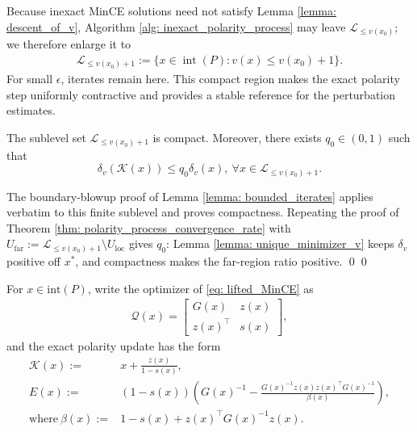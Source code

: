 \documentclass[smallextended]{svjour3}
\let\springerproof\proof
\let\endspringerproof\endproof
\renewenvironment{proof}{\springerproof}{%
  \ifhmode\qed\else\leavevmode\qed\fi\endspringerproof}
\newcommand{\K}{\mathcal{K}}
\begin{document}
Because inexact MinCE solutions need not satisfy Lemma
\ref{lemma: descent_of_v}, Algorithm \ref{alg: inexact_polarity_process} may
leave $\mathcal{L}_{\leq v(x_0)}$; we therefore enlarge it to
\begin{align}\label{eq: enlarged_sublevel_set}
    \mathcal{L}_{\leq v(x_0)+1} := \{ x \in \operatorname{int}(P): v(x) \leq v(x_0) + 1\}.
\end{align}
For small $\epsilon$, iterates remain here. This compact region makes the exact
polarity step uniformly contractive and provides a stable reference for the
perturbation estimates.
\begin{lemma}\label{lemma: inexact_sublevel_set}
    The sublevel set $\mathcal{L}_{\leq v(x_0)+1}$ is compact. Moreover, there exists $q_0\in (0,1)$ such that
        \begin{equation}\label{eq: inexact_q0}
            \delta_v(\K(x))\le q_0\delta_v(x), ~ \forall x\in \mathcal{L}_{\leq v(x_0)+1}.
        \end{equation}
\end{lemma}
\begin{proof}
    The boundary-blowup proof of Lemma \ref{lemma: bounded_iterates} applies
    verbatim to this finite sublevel and proves compactness. Repeating the
    proof of Theorem \ref{thm: polarity_process_convergence_rate} with
    $U_\mathrm{far}:=\mathcal{L}_{\leq v(x_0)+1}\setminus U_{\mathrm{loc}}$ gives
    $q_0$: Lemma \ref{lemma: unique_minimizer_v} keeps $\delta_v$ positive off
    $x^*$, and compactness makes the far-region ratio positive.
\end{proof}


For $x\in\mathrm{int}(P)$, write the optimizer of \eqref{eq: lifted_MinCE} as
\begin{align}
    \mathcal{Q}(x)=
    \begin{bmatrix}
        G(x) & z(x)\\
        z(x)^\top & s(x)
    \end{bmatrix},
\end{align}
and the exact polarity update has the form
\begin{align*}
    \K(x):= & x+\frac{z(x)}{1-s(x)}, \\
    E(x):= & (1-s(x))
    \left(
        G(x)^{-1}
        -
        \frac{G(x)^{-1}z(x)z(x)^\top G(x)^{-1}}{\beta(x)}
    \right), \\
    \text{where}~ \beta(x) := & 1-s(x) + z(x)^\top G(x)^{-1}z(x).
\end{align*}
\end{document}
